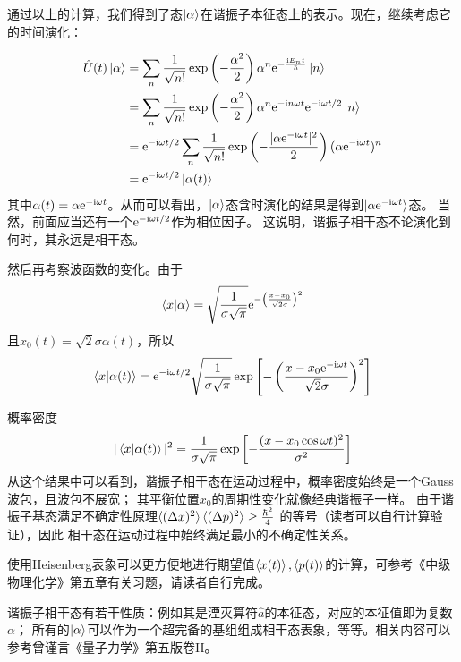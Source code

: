     通过以上的计算，我们得到了态\(\ket{\alpha}\)在谐振子本征态上的表示。现在，继续考虑它的时间演化：

    \[
        \begin{aligned}
            \hat{U}(t)\ket{\alpha} &= \sum_n \frac{1}{\sqrt{n!}}\exp\left(-\frac{\alpha^2}{2}\right) \alpha^n 
            \mathrm{e}^{-\frac{\mathrm{i} E_n t}{\hbar}}\ket{n}
            \\ &= \sum_n \frac{1}{\sqrt{n!}}\exp\left(-\frac{\alpha^2}{2}\right) \alpha^n 
            \mathrm{e}^{-\mathrm{i} n\omega t}\mathrm{e}^{-\mathrm{i} \omega t / 2} \ket{n}
            \\ &= \mathrm{e}^{-\mathrm{i} \omega t / 2}\sum_n \frac{1}{\sqrt{n!}}\exp\left(-\frac{|\alpha\mathrm{e}^{-\mathrm{i}\omega t}|^2}{2}\right) (\alpha\mathrm{e}^{-\mathrm{i}\omega t})^n
            \\ &= \mathrm{e}^{-\mathrm{i} \omega t / 2}\ket{\alpha(t)}
        \end{aligned}
    \]
    其中\(\alpha(t) = \alpha\mathrm{e}^{-\mathrm{i}\omega t}\)。从而可以看出，\(\ket{\alpha}\)态含时演化的结果是得到\(\ket{\alpha \mathrm{e}^{-\mathrm{i}\omega t}}\)态。
    当然，前面应当还有一个\(\mathrm{e}^{-\mathrm{i} \omega t / 2}\)作为相位因子。
    这说明，谐振子相干态不论演化到何时，其永远是相干态。

    然后再考察波函数的变化。由于
    \[
        \braket{x | \alpha} = \sqrt{\frac{1}{\sigma\sqrt{\pi}}} \mathrm{e}^{-\left(\frac{x - x_0}{\sqrt{2}\sigma}\right)^2}
    \]
    且\(x_0(t) = \sqrt{2}\sigma \alpha(t)\)，所以
    \[
        \braket{x | \alpha(t)} = \mathrm{e}^{-\mathrm{i} \omega t / 2} \sqrt{\frac{1}{\sigma \sqrt{\pi}}} 
        \exp \left[-\left(\frac{x - x_0\mathrm{e}^{-\mathrm{i}\omega t}}{\sqrt{2}\sigma}\right)^2\right]
    \]

    概率密度
    \[
        |\braket{x | \alpha(t)}|^2 = \frac{1}{\sigma\sqrt{\pi}}
        \exp\left[-\frac{(x - x_0\cos\omega t)^2}{\sigma^2}\right] 
    \]
    从这个结果中可以看到，谐振子相干态在运动过程中，概率密度始终是一个Gauss波包，且波包不展宽；
    其平衡位置\(x_0\)的周期性变化就像经典谐振子一样。
    由于谐振子基态满足不确定性原理\(\braket{(\Delta x)^2} \braket{(\Delta p)^2} \geq \frac{\hbar^2}{4}\) 的等号（读者可以自行计算验证），因此
    相干态在运动过程中始终满足最小的不确定性关系。

    使用Heisenberg表象可以更方便地进行期望值\(\braket{x(t)}, \braket{p(t)}\)的计算，可参考《中级物理化学》第五章有关习题，请读者自行完成。

    谐振子相干态有若干性质：例如其是湮灭算符\(\hat{a}\)的本征态，对应的本征值即为复数\(\alpha\)；
    所有的\(\ket{\alpha}\)可以作为一个超完备的基组组成相干态表象，等等。相关内容可以参考曾谨言《量子力学》第五版卷II。


    
    


